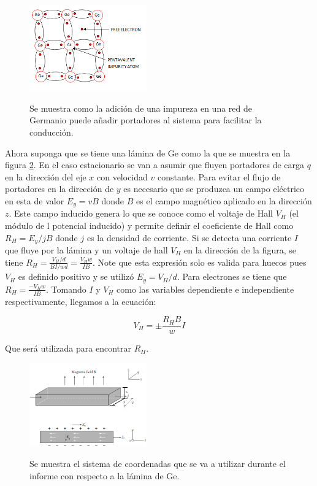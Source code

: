 \documentclass[twocolumn,showkeys,preprintnumbers,amsmath,amssymb]{revtex4}
\begin{document}
	\begin{figure}
		\centering
		\caption{Se muestra como la adici\'on de una impureza en una red de Germanio puede a\~nadir portadores al sistema para facilitar la conducci\'on\cite{bib:tipon}.}
		\includegraphics[width=0.45\textwidth]{tipon.png}
		\label{fig:tipon}
	\end{figure}

	Ahora suponga que se tiene una l\'amina de Ge como la que se muestra en la figura \ref{fig:lamina}. En el caso estacionario se van a asumir que fluyen portadores de carga $q$ en la direcci\'on del eje $x$ con velocidad $v$ constante. Para evitar el flujo de portadores en la direcci\'on de $y$ es necesario que se produzca un campo el\'ectrico en esta de valor $E_y=vB$ donde $B$ es el campo magn\'etico aplicado en la direcci\'on $z$. Este campo inducido genera lo que se conoce como el voltaje de Hall $V_H$ (el m\'odulo de l potencial inducido) y permite definir el coeficiente de Hall como $R_H=E_y/jB$ donde $j$ es la densidad de corriente. Si se detecta una corriente $I$ que fluye por la l\'amina y un voltaje de hall $V_H$ en la direcci\'on de la figura, se tiene $R_H=\frac{V_H/d}{BI/wd}=\frac{V_Hw}{IB}$. Note que esta expresi\'on solo es valida para huecos pues $V_H$ es definido positivo y se utiliz\'o $E_y=V_H/d$. Para electrones se tiene que $R_H=\frac{-V_Hw}{IB}$. Tomando $I$ y $V_H$ como las variables dependiente e independiente respectivamente, llegamos a la ecuación:
	
	\begin{equation}
		V_H=\pm \frac{R_H B}{w} I \label{eq:RH}
	\end{equation}
	
	Que será utilizada para encontrar $R_H$.

	\begin{figure}
		\centering
		\caption{Se muestra el sistema de coordenadas que se va a utilizar durante el informe con respecto a la l\'amina de Ge\cite{bib:guia}.}
		\includegraphics[width=0.45\textwidth]{hall.png}
		\label{fig:lamina}
	\end{figure}
\end{document}
